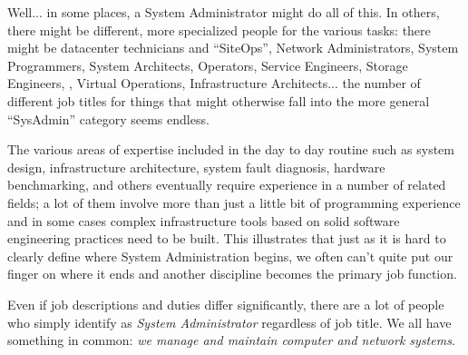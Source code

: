 Well... in some places, a System Administrator might
do all of this.  In others, there might be different,
more specialized people for the various tasks:  there
might be datacenter technicians and ``SiteOps'',
Network Administrators, System Programmers, System
Architects, Operators, Service Engineers, Storage
Engineers, , Virtual Operations,
Infrastructure Architects... the number of different
job titles for things that might otherwise fall into
the more general ``SysAdmin'' category seems endless.

The various areas of expertise included in the day to
day routine such as system design, infrastructure
architecture, system fault diagnosis, hardware
benchmarking, and others eventually require experience
in a number of related fields; a lot of them involve
more than just a little bit of programming experience
and in some cases complex infrastructure tools based
on solid software engineering practices need to be
built.  This illustrates that just as it is hard to
clearly define where System Administration begins, we
often can't quite put our finger on where it ends and
another discipline becomes the primary job function.

Even if job descriptions and duties differ
significantly, there are a lot of people who simply
identify as {\em System Administrator} regardless of
job title.  We all have something in common: {\em we
manage and maintain computer and network systems}.

